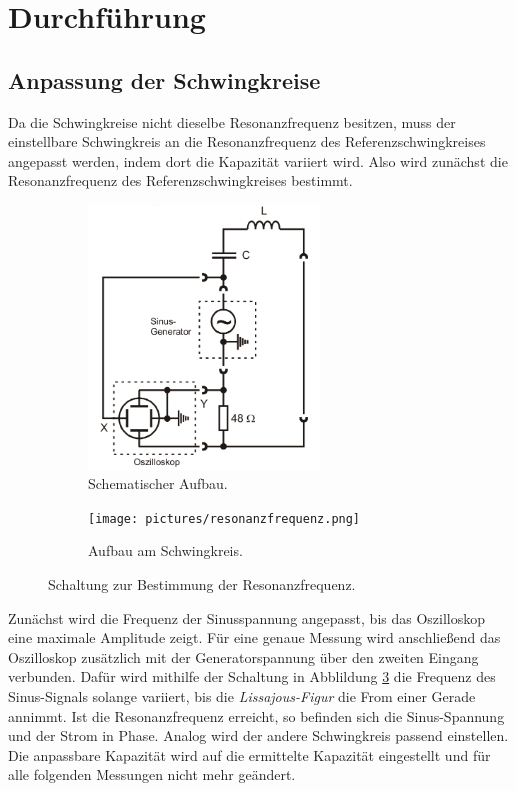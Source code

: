 \newpage
\section{Durchführung}
\label{sec:Durchführung}


\subsection{Anpassung der Schwingkreise}

Da die Schwingkreise nicht dieselbe Resonanzfrequenz besitzen, muss der einstellbare Schwingkreis an die Resonanzfrequenz
des Referenzschwingkreises angepasst werden, indem dort die Kapazität variiert wird.
Also wird zunächst die Resonanzfrequenz des Referenzschwingkreises bestimmt.

\begin{figure} 
    \begin{subfigure}{0.48\textwidth}
        \includegraphics[height=7cm] {pictures/messschaltung.png} 
        \caption{Schematischer Aufbau. \cite{v355}}
        \label{fig:schema}
    \end{subfigure}
    \hfill
    \begin{subfigure}{0.48\textwidth}
        \texttt{[image: pictures/resonanzfrequenz.png]} 
        \caption{Aufbau am Schwingkreis.}
        \label{fig:foto}
    \end{subfigure}
    \caption{Schaltung zur Bestimmung der Resonanzfrequenz.}
    \label{fig:messschaltung}
\end{figure} 

Zunächst wird die Frequenz der Sinusspannung angepasst, bis das Oszilloskop eine maximale Amplitude zeigt.
Für eine genaue Messung wird anschließend das Oszilloskop zusätzlich mit der Generatorspannung über den zweiten Eingang verbunden.
Dafür wird mithilfe der Schaltung in Abblildung \ref{fig:messschaltung} die Frequenz des Sinus-Signals solange variiert,
bis die \textit{Lissajous-Figur} die From einer Gerade annimmt. 
Ist die Resonanzfrequenz erreicht, so befinden sich die Sinus-Spannung und der Strom in Phase.
Analog wird der andere Schwingkreis passend einstellen.
Die anpassbare Kapazität wird auf die ermittelte Kapazität eingestellt
und für alle folgenden Messungen nicht mehr geändert.

